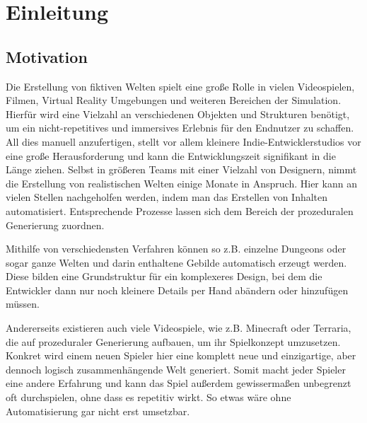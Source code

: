 %
\chapter{Einleitung}

\section{Motivation}
Die Erstellung von fiktiven Welten spielt eine große Rolle in vielen Videospielen, Filmen, Virtual Reality Umgebungen
und weiteren Bereichen der Simulation. Hierfür wird eine Vielzahl an verschiedenen Objekten und Strukturen benötigt, um
ein nicht-repetitives und immersives Erlebnis für den Endnutzer zu schaffen. All dies manuell anzufertigen, stellt vor
allem kleinere Indie-Entwicklerstudios vor eine große Herausforderung und kann die Entwicklungszeit signifikant in die
Länge ziehen. Selbst in größeren Teams mit einer Vielzahl von Designern, nimmt die Erstellung von realistischen Welten
einige Monate in Anspruch. \cite{10_freiknecht} Hier kann an vielen Stellen nachgeholfen werden, indem man das Erstellen
von Inhalten automatisiert. Entsprechende Prozesse lassen sich dem Bereich der prozeduralen Generierung zuordnen.

Mithilfe von verschiedensten Verfahren können so z.B. einzelne Dungeons oder sogar ganze Welten und darin enthaltene Gebilde
automatisch erzeugt werden. Diese bilden eine Grundstruktur für ein komplexeres Design, bei dem die Entwickler dann nur noch
kleinere Details per Hand abändern oder hinzufügen müssen.

Andererseits existieren auch viele Videospiele, wie z.B. Minecraft oder Terraria, die auf prozeduraler Generierung aufbauen, um
ihr Spielkonzept umzusetzen. Konkret wird einem neuen Spieler hier eine komplett neue und einzigartige, aber dennoch logisch
zusammenhängende Welt generiert. Somit macht jeder Spieler eine andere Erfahrung und kann das Spiel außerdem gewissermaßen
unbegrenzt oft durchspielen, ohne dass es repetitiv wirkt. So etwas wäre ohne Automatisierung gar nicht erst umsetzbar.

